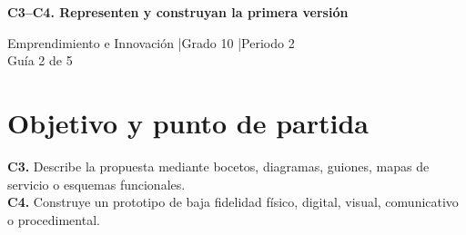 \makeatletter
{}
\makeatother


\usepackage[spanish]{babel}
\usepackage{lmodern}
\usepackage{titlesec}
\geometry{a4paper,margin=1.6cm}
\linespread{1.10}

\hypersetup{allcolors=LinkColor}
\newcommand{\guidelink}[2]{\href{#1}{\textbf{\underline{#2}}}}
\newcommand{\instruction}[1]{\textcolor{InstructionColor}{\textbf{#1}}}
\newcommand{\concept}[1]{\textcolor{ConceptColor}{\textbf{#1}}}
\newcommand{\checkbox}{%
    \begingroup
    \setlength{\fboxrule}{0.4pt}%
    \setlength{\fboxsep}{2pt}%
    \fbox{\rule{0pt}{0.8ex}\rule{0.8ex}{0pt}}%
    \endgroup}

\setlength{\parskip}{4pt}
\setlength{\tabcolsep}{5pt}
\renewcommand{\arraystretch}{1.15}
\titleformat{\section}{\large\bfseries\color{HeadingColor}}{}{0pt}{}
\titlespacing*{\section}{0pt}{10pt}{3pt}




\begin{center}
{\Large\bfseries\color{HeadingColor} C3--C4. Representen y construyan la primera versión\par}
\vspace{3pt}
Emprendimiento e Innovación \enspace|\enspace Grado 10 \enspace|\enspace Periodo 2\\
Guía 2 de 5
\end{center}

\section*{Objetivo y punto de partida}
\concept{C3.} Describe la propuesta mediante bocetos, diagramas, guiones, mapas de servicio o esquemas funcionales.\\
\concept{C4.} Construye un prototipo de baja fidelidad físico, digital, visual, comunicativo o procedimental.

